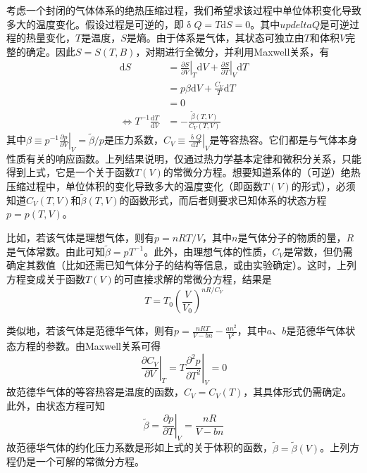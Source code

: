\documentclass[main.tex]{subfiles}
\begin{document}
\begin{example}
    考虑一个封闭的气体体系的绝热压缩过程，我们希望求该过程中单位体积变化导致多大的温度变化。假设过程是可逆的，即$\updelta Q=T\mathrm{d}S=0$。其中$updelta Q$是可逆过程的热量变化，$T$是温度，$S$是熵。由于体系是气体，其状态可独立由$T$和体积$V$完整的确定。因此$S=S\left(T,B\right)$，对期进行全微分，并利用Maxwell关系，有
    \begin{align*}
        \mathrm{d}S                                           & =\left.\frac{\partial S}{\partial V}\right|_{T}\mathrm{d}V+\left.\frac{\partial S}{\partial T}\right|_{V}\mathrm{d}T \\
                                                              & =p\beta\mathrm{d}V+\frac{C_V}{T}\mathrm{d}T                                                                          \\
                                                              & =0                                                                                                                   \\
        \Leftrightarrow T^{-1}\frac{\mathrm{d}T}{\mathrm{d}V} & =-\frac{\tilde{\beta}\left(T,V\right)}{C_V\left(T,V\right)}
    \end{align*}
    其中$\beta\equiv p^{-1}\left.\frac{\partial p}{\partial V}\right|_{V}=\tilde{\beta}/p$是压力系数，$C_V\equiv\left.\frac{\updelta Q}{\mathrm{d}T}\right|_{V}$是等容热容。它们都是与气体本身性质有关的响应函数。上列结果说明，仅通过热力学基本定律和微积分关系，只能得到上式，它是一个关于函数$T\left(V\right)$的常微分方程。想要知道系体的（可逆）绝热压缩过程中，单位体积的变化导致多大的温度变化（即函数$T\left(V\right)$的形式），必须知道$C_V\left(T,V\right)$和$\tilde{\beta}\left(T,V\right)$的函数形式，而后者则要求已知体系的状态方程$p=p\left(T,V\right)$。

    比如，若该气体是理想气体，则有$p=nRT/V$，其中$n$是气体分子的物质的量，$R$是气体常数。由此可知$\tilde{\beta}=pT^{-1}$。此外，由理想气体的性质，$C_V$是常数，但仍需确定其数值（比如还需已知气体分子的结构等信息，或由实验确定）。这时，上列方程变成关于函数$T\left(V\right)$的可直接求解的常微分方程，结果是
    \[T=T_0\left(\frac{V}{V_0}\right)^{nR/C_V}\]

    类似地，若该气体是范德华气体，则有$p=\frac{nRT}{V-bn}-\frac{an^2}{V^2}$，其中$a$、$b$是范德华气体状态方程的参数。由Maxwell关系可得
    \[\left.\frac{\partial C_V}{\partial V}\right|_T=T\left.\frac{\partial^2p}{\partial T^2}\right|_V=0\]
    故范德华气体的等容热容是温度的函数，$C_V=C_V\left(T\right)$，其具体形式仍需确定。此外，由状态方程可知
    \[\tilde{\beta}=\left.\frac{\partial p}{\partial T}\right|_V=\frac{nR}{V-bn}\]
    故范德华气体的约化压力系数是形如上式的关于体积的函数，$\tilde{\beta}=\tilde{\beta}\left(V\right)$。上列方程仍是一个可解的常微分方程。
\end{example}
\end{document}
